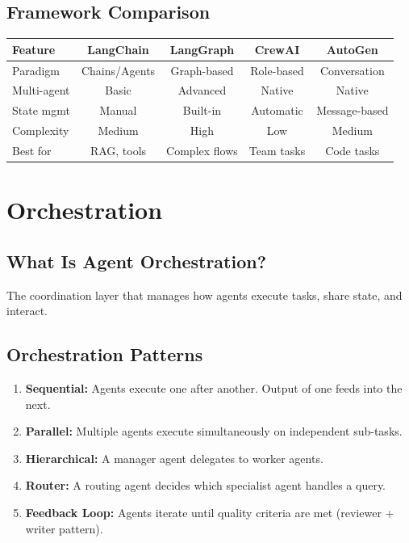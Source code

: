 \documentclass[11pt,a4paper]{article}
\begin{document}
\subsection{Framework Comparison}
\begin{center}
\begin{tabular}{lcccc}
\toprule
\textbf{Feature} & \textbf{LangChain} & \textbf{LangGraph} & \textbf{CrewAI} & \textbf{AutoGen} \\
\midrule
Paradigm & Chains/Agents & Graph-based & Role-based & Conversation \\
Multi-agent & Basic & Advanced & Native & Native \\
State mgmt & Manual & Built-in & Automatic & Message-based \\
Complexity & Medium & High & Low & Medium \\
Best for & RAG, tools & Complex flows & Team tasks & Code tasks \\
\bottomrule
\end{tabular}
\end{center}

\section{Orchestration}

\subsection{What Is Agent Orchestration?}
The coordination layer that manages how agents execute tasks, share state, and interact.

\subsection{Orchestration Patterns}
\begin{enumerate}[nosep]
  \item \textbf{Sequential:} Agents execute one after another. Output of one feeds into the next.
  \item \textbf{Parallel:} Multiple agents execute simultaneously on independent sub-tasks.
  \item \textbf{Hierarchical:} A manager agent delegates to worker agents.
  \item \textbf{Router:} A routing agent decides which specialist agent handles a query.
  \item \textbf{Feedback Loop:} Agents iterate until quality criteria are met (reviewer + writer pattern).
\end{enumerate}
\end{document}
